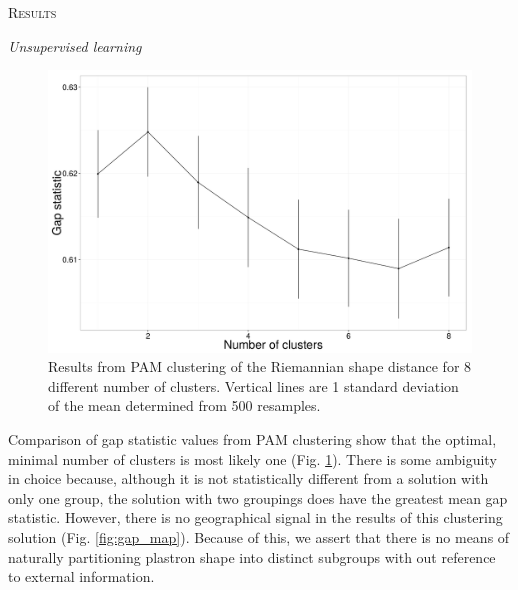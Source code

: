 \documentclass[12pt,letterpaper]{article}
\renewcommand{\section}[1]{%
\bigskip
\begin{center}
\begin{Large}
\normalfont\scshape #1
\medskip
\end{Large}
\end{center}}
\renewcommand{\subsection}[1]{%
\bigskip
\begin{center}
\begin{large}
\normalfont\itshape #1
\end{large}
\end{center}}
\begin{document}
\section{Results}

\subsection{Unsupervised learning}

\begin{figure}[ht]
  \centering
  \includegraphics[height = 0.5\textheight, width = \textwidth, keepaspectratio = true]{figure/gap_res}
  \caption{Results from PAM clustering of the Riemannian shape distance for 8 different number of clusters. Vertical lines are 1 standard deviation of the mean determined from 500 resamples.}
  \label{fig:gap}
\end{figure}

Comparison of gap statistic values from PAM clustering show that the optimal, minimal number of clusters is most likely one (Fig. \ref{fig:gap}). There is some ambiguity in choice because, although it is not statistically different from a solution with only one group, the solution with two groupings does have the greatest mean gap statistic. However, there is no geographical signal in the results of this clustering solution (Fig. \ref{fig:gap_map}). Because of this, we assert that there is no means of naturally partitioning plastron shape into distinct subgroups with out reference to external information.
\end{document}
